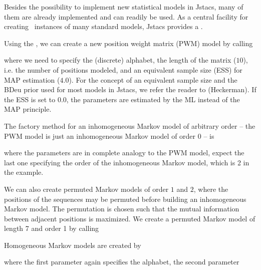 Besides the possibility to implement new statistical models in Jstacs, many of them are already implemented and can readily be used.
As a central facility for creating \TrainSM~instances of many standard models, Jstacs provides a \TrainSMFactory.

Using the \TrainSMFactory, we can create a new position weight matrix (PWM) model by calling
\addtocounter{off}{10}
where we need to specify the (discrete) alphabet, the length of the matrix ($10$), i.e. the number of positions modeled, and an equivalent sample size (ESS) for MAP estimation ($4.0$). For the concept of an equivalent sample size and the BDeu prior used for most models in Jstacs, we refer the reader to (Heckerman). If the ESS is set to $0.0$, the parameters are estimated by the ML instead of the MAP principle.

The factory method for an inhomogeneous Markov model of arbitrary order -- the PWM model is just an inhomogeneous Markov model of order 0 -- is
\addtocounter{off}{1}
where the parameters are in complete analogy to the PWM model, expect the last one specifying the order of the inhomogeneous Markov model, which is 2 in the example.

We can also create permuted Markov models of order $1$ and $2$, where the positions of the sequences may be permuted before building an inhomogeneous Markov model. The permutation is chosen such that the mutual information between adjacent positions is maximized. We create a permuted Markov model of length 7 and order 1 by calling
\addtocounter{off}{1}

Homogeneous Markov models are created by
\addtocounter{off}{1}
where the first parameter again specifies the alphabet, the second parameter 

\subsection{\DiffSM}